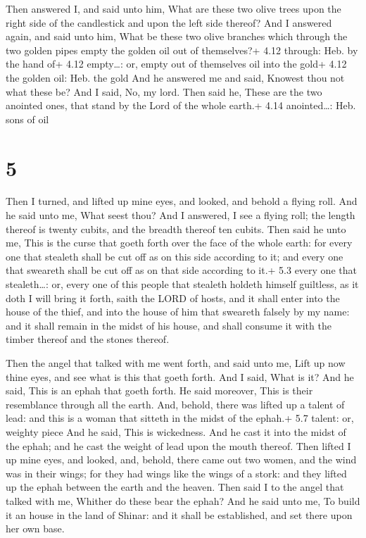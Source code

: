  Then answered I, and said unto him, What are these two
olive trees upon the right side of the candlestick and upon the left
side thereof?  And I answered again, and said unto him,
What be these two olive branches which through the two golden pipes
empty the golden oil out of themselves?+ 4.12 through: Heb. by the hand
of+ 4.12 empty\ldots: or, empty out of themselves oil into the gold+
4.12 the golden oil: Heb. the gold  And he answered me and
said, Knowest thou not what these be? And I said, No, my lord.
 Then said he, These are the two anointed ones, that stand
by the Lord of the whole earth.+ 4.14 anointed\ldots: Heb. sons of oil

\hypertarget{section-4}{%
\section{5}\label{section-4}}

 Then I turned, and lifted up mine eyes, and looked, and
behold a flying roll.  And he said unto me, What seest thou?
And I answered, I see a flying roll; the length thereof is twenty
cubits, and the breadth thereof ten cubits.  Then said he
unto me, This is the curse that goeth forth over the face of the whole
earth: for every one that stealeth shall be cut off as on this side
according to it; and every one that sweareth shall be cut off as on that
side according to it.+ 5.3 every one that stealeth\ldots: or, every one
of this people that stealeth holdeth himself guiltless, as it doth
 I will bring it forth, saith the LORD of hosts, and it
shall enter into the house of the thief, and into the house of him that
sweareth falsely by my name: and it shall remain in the midst of his
house, and shall consume it with the timber thereof and the stones
thereof.

 Then the angel that talked with me went forth, and said
unto me, Lift up now thine eyes, and see what is this that goeth forth.
 And I said, What is it? And he said, This is an ephah that
goeth forth. He said moreover, This is their resemblance through all the
earth.  And, behold, there was lifted up a talent of lead:
and this is a woman that sitteth in the midst of the ephah.+ 5.7 talent:
or, weighty piece  And he said, This is wickedness. And he
cast it into the midst of the ephah; and he cast the weight of lead upon
the mouth thereof.  Then lifted I up mine eyes, and looked,
and, behold, there came out two women, and the wind was in their wings;
for they had wings like the wings of a stork: and they lifted up the
ephah between the earth and the heaven.  Then said I to the
angel that talked with me, Whither do these bear the ephah?
 And he said unto me, To build it an house in the land of
Shinar: and it shall be established, and set there upon her own base.

